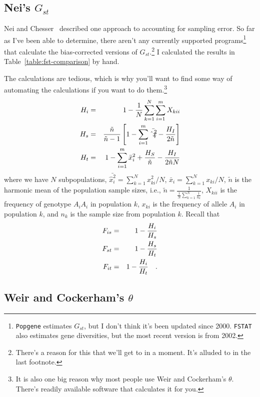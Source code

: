 \subsection*{Nei's $G_{st}$}

Nei and Chesser~\cite{Nei-Chesser-1983} described one approach to
accounting for sampling error. So far as I've been able to determine,
there aren't any currently supported programs\footnote{{\tt Popgene}
  estimates $G_{st}$, but I don't think it's been updated since
  2000. {\tt FSTAT} also estimates gene diversities, but the most
  recent version is from 2002.}
that calculate the bias-corrected versions of
$G_{st}$.\footnote{There's a reason for this that we'll get to in a
  moment. It's alluded to in the last footnote.} I calculated the
results in Table~\ref{table:fst-comparison} by hand.

The calculations are tedious, which is why you'll want to find some
way of automating the calculations if you want to do them.\footnote{It
  is also one big reason why most people use Weir and Cockerham's
  $\theta$. There's readily available software that calculates it for
  you.}
\begin{eqnarray*}
H_{i} &=& 1 - {1 \over N} \sum_{k=1}^{N} \sum_{i=1}^{m} {X_{kii}} \\
H_{s} &=& {\tilde n \over {\tilde n - 1}}
         \left[1 - \sum_{i=1}^{m} {\bar {\hat x_{i}^{2}}}
         - {H_{I} \over {2 \tilde n}}\right] \\
H_{t} &=& 1 - \sum_{i=1}^{m} {\bar x_{i}^{2}} + {H_{S} \over {\tilde n}}
         - {H_{I} \over {2 \tilde n N}}
\end{eqnarray*}
where we have $N$ subpopulations,
${\bar {\hat x_{i}^{2}}} = \sum_{k=1}^{N} {x_{ki}^{2}}/N$,
${\bar x_{i}} = \sum_{k=1}^{N} x_{ki}/N$, $\tilde n$
is the harmonic mean of the population sample sizes, i.e.,
$ \tilde n = \frac{1}{\frac{1}{N} \sum_{k=1}^{N} \frac{1}{n_k}}$,
$X_{kii}$ is the frequency of genotype $A_{i}A_{i}$ in population $k$,
$x_{ki}$ is the frequency of allele $A_{i}$ in population $k$, and $n_k$ is
the sample size from population $k$.  Recall that
\begin{eqnarray*}
F_{is} &=& 1 - {H_{i} \over H_{s}} \\
F_{st} &=& 1 - {H_{s} \over H_{t}} \\
F_{it} &=& 1 - {H_{i} \over H_{t}} \quad .
\end{eqnarray*}

\subsection*{Weir and Cockerham's $\theta$}

